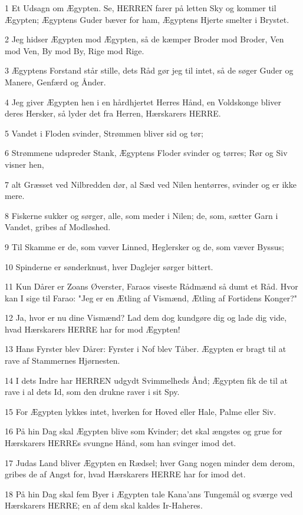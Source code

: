 \par 1 Et Udsagn om Ægypten. Se, HERREN farer på letten Sky og kommer til Ægypten; Ægyptens Guder bæver for ham, Ægyptens Hjerte smelter i Brystet.
\par 2 Jeg hidser Ægypten mod Ægypten, så de kæmper Broder mod Broder, Ven mod Ven, By mod By, Rige mod Rige.
\par 3 Ægyptens Forstand står stille, dets Råd gør jeg til intet, så de søger Guder og Manere, Genfærd og Ånder.
\par 4 Jeg giver Ægypten hen i en hårdhjertet Herres Hånd, en Voldskonge bliver deres Hersker, så lyder det fra Herren, Hærskarers HERRE.
\par 5 Vandet i Floden svinder, Strømmen bliver sid og tør;
\par 6 Strømmene udspreder Stank, Ægyptens Floder svinder og tørres; Rør og Siv visner hen,
\par 7 alt Græsset ved Nilbredden dør, al Sæd ved Nilen hentørres, svinder og er ikke mere.
\par 8 Fiskerne sukker og sørger, alle, som meder i Nilen; de, som, sætter Garn i Vandet, gribes af Modløshed.
\par 9 Til Skamme er de, som væver Linned, Heglersker og de, som væver Byssus;
\par 10 Spinderne er sønderknust, hver Daglejer sørger bittert.
\par 11 Kun Dårer er Zoans Øverster, Faraos viseste Rådmænd så dumt et Råd. Hvor kan I sige til Farao: "Jeg er en Ætling af Vismænd, Ætling af Fortidens Konger?"
\par 12 Ja, hvor er nu dine Vismænd? Lad dem dog kundgøre dig og lade dig vide, hvad Hærskarers HERRE har for mod Ægypten!
\par 13 Hans Fyrster blev Dårer: Fyrster i Nof blev Tåber. Ægypten er bragt til at rave af Stammernes Hjørnesten.
\par 14 I dets Indre har HERREN udgydt Svimmelheds Ånd; Ægypten fik de til at rave i al dets Id, som den drukne raver i sit Spy.
\par 15 For Ægypten lykkes intet, hverken for Hoved eller Hale, Palme eller Siv.
\par 16 På hin Dag skal Ægypten blive som Kvinder; det skal ængstes og grue for Hærskarers HERREs svungne Hånd, som han svinger imod det.
\par 17 Judas Land bliver Ægypten en Rædsel; hver Gang nogen minder dem derom, gribes de af Angst for, hvad Hærskarers HERRE har for imod det.
\par 18 På hin Dag skal fem Byer i Ægypten tale Kana'ans Tungemål og sværge ved Hærskarers HERRE; en af dem skal kaldes Ir-Haheres.
